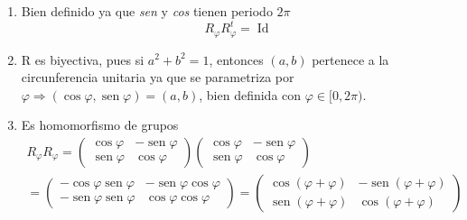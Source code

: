 \documentclass[12pt, a4paper, ones, notitlepage, openany,titlepage]{article}
\begin{document}
\begin{enumerate}[label=(\arabic*)]
	\item Bien definido ya que \textit{sen} y \textit{cos} tienen periodo $2\pi$
	$$
	R_\varphi R_\varphi^t = \operatorname{Id}
	$$
	\item R es biyectiva, pues si $a^2 + b^2 = 1$, entonces $(a,b)$ pertenece a la circunferencia unitaria ya que se parametriza por $\varphi \Longrightarrow (\operatorname{cos}\varphi, \operatorname{sen}\varphi) = (a,b)$, bien definida con $\varphi \in [0,2\pi)$.
	\item Es homomorfismo de grupos
	\begin{gather*}
		R_\varphi R_\varphi =
		\begin{pmatrix}
			\operatorname{cos}\varphi & -\operatorname{sen}\varphi \\
			\operatorname{sen}\varphi & \operatorname{cos}\varphi
		\end{pmatrix}
		\begin{pmatrix}
			\operatorname{cos}\varphi & -\operatorname{sen}\varphi \\
			\operatorname{sen}\varphi & \operatorname{cos}\varphi
		\end{pmatrix} \\ =
		\begin{pmatrix}
			-\operatorname{cos}\varphi\operatorname{sen}\varphi & -\operatorname{sen}\varphi\operatorname{cos}\varphi \\
			-\operatorname{sen}\varphi\operatorname{sen}\varphi & \operatorname{cos}\varphi\operatorname{cos}\varphi
		\end{pmatrix} = 
		\begin{pmatrix}
			\operatorname{cos}(\varphi + \varphi) & -\operatorname{sen}(\varphi + \varphi) \\
			\operatorname{sen}(\varphi + \varphi) & \operatorname{cos}(\varphi + \varphi)
		\end{pmatrix}
	\end{gather*}
\end{enumerate}
\end{document}
